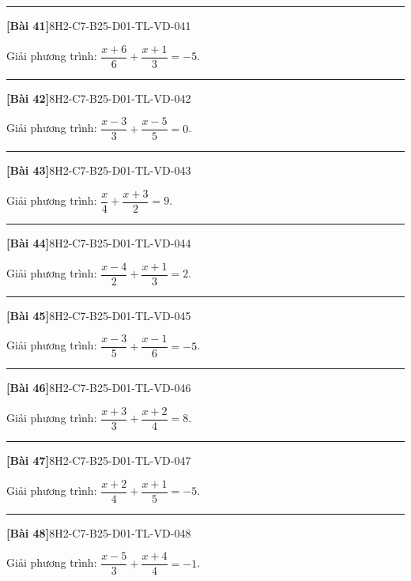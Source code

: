 \documentclass[12pt,a4paper]{article}
\newif\ifloigiai
\newenvironment{cauhoi}[2]{%
  \par\medskip\noindent\rule{\textwidth}{0.4pt}\par\nopagebreak
  \noindent\textbf{[#1]}\hfill{\scriptsize\ttfamily #2}\par\nopagebreak\smallskip}{\par}
\newcommand{\loigiai}[1]{\ifloigiai\par\smallskip\noindent\textit{Lời giải.} #1\par\fi}
\begin{document}
\begin{cauhoi}{Bài 41}{8H2-C7-B25-D01-TL-VD-041}
Giải phương trình: $\dfrac{x + 6}{6}+\dfrac{x + 1}{3}=-5$.
\loigiai{Quy đồng, nhân hai vế với $6$: $(x + 6)+2(x + 1)=-30$, tức là $3x + 8=-30$. Suy ra $3x=-38$, nên $x=-\dfrac{38}{3}$.}
\end{cauhoi}
\begin{cauhoi}{Bài 42}{8H2-C7-B25-D01-TL-VD-042}
Giải phương trình: $\dfrac{x - 3}{3}+\dfrac{x - 5}{5}=0$.
\loigiai{Quy đồng, nhân hai vế với $15$: $5(x - 3)+3(x - 5)=0$, tức là $8x - 30=0$. Suy ra $8x=30$, nên $x=\dfrac{15}{4}$.}
\end{cauhoi}
\begin{cauhoi}{Bài 43}{8H2-C7-B25-D01-TL-VD-043}
Giải phương trình: $\dfrac{x}{4}+\dfrac{x + 3}{2}=9$.
\loigiai{Quy đồng, nhân hai vế với $4$: $1(x)+2(x + 3)=36$, tức là $3x + 6=36$. Suy ra $3x=30$, nên $x=10$.}
\end{cauhoi}
\begin{cauhoi}{Bài 44}{8H2-C7-B25-D01-TL-VD-044}
Giải phương trình: $\dfrac{x - 4}{2}+\dfrac{x + 1}{3}=2$.
\loigiai{Quy đồng, nhân hai vế với $6$: $3(x - 4)+2(x + 1)=12$, tức là $5x - 10=12$. Suy ra $5x=22$, nên $x=\dfrac{22}{5}$.}
\end{cauhoi}
\begin{cauhoi}{Bài 45}{8H2-C7-B25-D01-TL-VD-045}
Giải phương trình: $\dfrac{x - 3}{5}+\dfrac{x - 1}{6}=-5$.
\loigiai{Quy đồng, nhân hai vế với $30$: $6(x - 3)+5(x - 1)=-150$, tức là $11x - 23=-150$. Suy ra $11x=-127$, nên $x=-\dfrac{127}{11}$.}
\end{cauhoi}
\begin{cauhoi}{Bài 46}{8H2-C7-B25-D01-TL-VD-046}
Giải phương trình: $\dfrac{x + 3}{3}+\dfrac{x + 2}{4}=8$.
\loigiai{Quy đồng, nhân hai vế với $12$: $4(x + 3)+3(x + 2)=96$, tức là $7x + 18=96$. Suy ra $7x=78$, nên $x=\dfrac{78}{7}$.}
\end{cauhoi}
\begin{cauhoi}{Bài 47}{8H2-C7-B25-D01-TL-VD-047}
Giải phương trình: $\dfrac{x + 2}{4}+\dfrac{x + 1}{5}=-5$.
\loigiai{Quy đồng, nhân hai vế với $20$: $5(x + 2)+4(x + 1)=-100$, tức là $9x + 14=-100$. Suy ra $9x=-114$, nên $x=-\dfrac{38}{3}$.}
\end{cauhoi}
\begin{cauhoi}{Bài 48}{8H2-C7-B25-D01-TL-VD-048}
Giải phương trình: $\dfrac{x - 5}{3}+\dfrac{x + 4}{4}=-1$.
\loigiai{Quy đồng, nhân hai vế với $12$: $4(x - 5)+3(x + 4)=-12$, tức là $7x - 8=-12$. Suy ra $7x=-4$, nên $x=-\dfrac{4}{7}$.}
\end{cauhoi}
\end{document}
